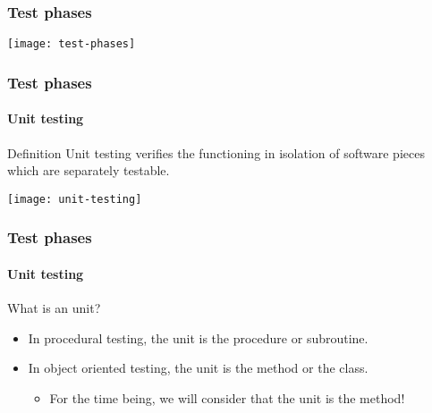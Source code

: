 \begin{frame}[c]
\frametitle{Test phases}

\begin{block:fact}{}
    \centering
    \texttt{[image: test-phases]}
\end{block:fact}
\end{frame}


\begin{frame}
\frametitle{Test phases}
\framesubtitle{Unit testing}
\label{concept:unit-testing}

\begin{block:concept}{Definition}
Unit testing verifies the functioning in isolation of software pieces which
are separately testable.
\end{block:concept}

\begin{block:fact}{}
    \centering
    \texttt{[image: unit-testing]}
\end{block:fact}

\hfill
{}
\end{frame}


\begin{frame}
\frametitle{Test phases}
\framesubtitle{Unit testing}

\begin{block:fact}{What is an unit?}
\begin{itemize}
	\item In procedural testing, the unit is the procedure or subroutine.

	\item In object oriented testing, the unit is the method or the class.
	\begin{itemize}
		\item For the time being, we will consider that the unit is the method!
	\end{itemize}
\end{itemize}
\end{block:fact}
\end{frame}



